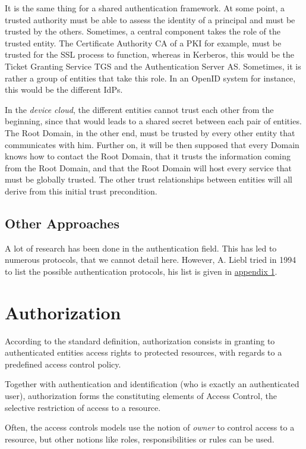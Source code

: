 It is the same thing for a shared authentication framework. At some point, a trusted authority must be able to assess the identity of a principal and must be trusted by the others.
Sometimes, a central component takes the role of the trusted entity. The Certificate Authority CA of a PKI for example, must be trusted for the SSL process to function, whereas in Kerberos, this would be the Ticket Granting Service TGS and the Authentication Server AS.
Sometimes, it is rather a group of entities that take this role. In an OpenID system for instance, this would be the different IdPs. 

In the \emph{device cloud}, the different entities cannot trust each other from the beginning, since that would leads to a shared secret between each pair of entities. The Root Domain, in the other end, must be trusted by every other entity that communicates with him. Further on, it will be then supposed that every Domain knows how to contact the Root Domain, that it trusts the information coming from the Root Domain, and that the Root Domain will host every service that must be globally trusted. The other trust relationships between entities will all derive from this initial trust precondition.

\subsection{Other Approaches}
A lot of research has been done in the authentication field. This has led to numerous protocols, that we cannot detail here. However,  A. Liebl tried in 1994 to list the possible authentication protocols, his list is given in \hyperref[appendix:protocol_list]{appendix 1}. 

\section{Authorization}
\label{02_authorization}
According to the standard definition, authorization consists in granting to authenticated entities access rights to protected resources, with regards to a predefined access control policy.

Together with authentication and identification (who is exactly an authenticated user), authorization forms the constituting elements of Access Control, the selective restriction of access to a resource.

Often, the access controls models use the notion of \textit{owner} to control access to a resource, but other notions like roles, responsibilities or rules can be used.
 

